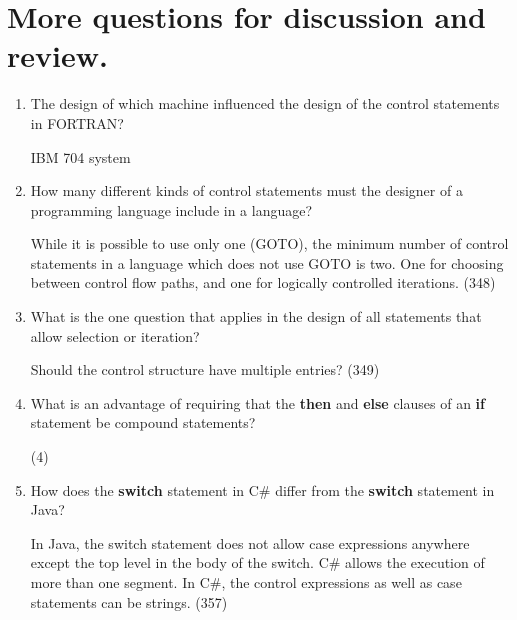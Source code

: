 \section{More questions for discussion and review.}

\begin{enumerate}
  \item The design of which machine influenced the design
    of the control statements in FORTRAN?
    
 \begin{answer}
    IBM 704 system 
     \end{answer}

  \item How many different kinds of control statements
    must the designer of a programming language include
    in a language?

 \begin{answer}
    While it is possible to use only one (GOTO), the minimum number of control statements in a language which does not use GOTO is two. One for choosing between control flow paths, and one for logically controlled iterations. (348)
 \end{answer}
 
  \item What is the one question that applies in the
    design of all statements that allow selection or
    iteration?

 \begin{answer}
    Should the control structure have multiple entries? (349)
 \end{answer}
 
  \item What is an advantage of requiring that
    the \textbf{then} and \textbf{else} clauses of
    an \textbf{if} statement be compound statements?

 \begin{answer}
    (4)
 \end{answer}
 
  \item How does the \textbf{switch} statement in C\#
    differ from the \textbf{switch} statement in Java?

 \begin{answer}
   In Java, the switch statement does not allow case expressions anywhere except the top level in the body of the switch.  C\#  allows the execution of more than one segment. In C\#, the control expressions as well as case statements can be strings. (357)
 \end{answer}
 

\end{enumerate}
